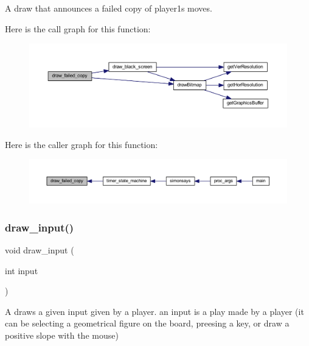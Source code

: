 A draw that announces a failed copy of player1\textquotesingle{}s moves. 

Here is the call graph for this function\+:\nopagebreak
\begin{figure}[H]
\begin{center}
\leavevmode
\includegraphics[width=350pt]{group___bitmap_ga06ba1c351da1ccdfa323137861c1a9af_cgraph}
\end{center}
\end{figure}
Here is the caller graph for this function\+:\nopagebreak
\begin{figure}[H]
\begin{center}
\leavevmode
\includegraphics[width=350pt]{group___bitmap_ga06ba1c351da1ccdfa323137861c1a9af_icgraph}
\end{center}
\end{figure}
\mbox{\label{group___bitmap_ga556f9cfc8664aff3169e9775310a5144}} 
\subsubsection{\texorpdfstring{draw\+\_\+input()}{draw\_input()}}
{\footnotesize\ttfamily void draw\+\_\+input (\begin{DoxyParamCaption}\item[{int}]{input }\end{DoxyParamCaption})}



A draws a given input given by a player. an input is a play made by a player (it can be selecting a geometrical figure on the board, preesing a key, or draw a positive slope with the mouse) 


